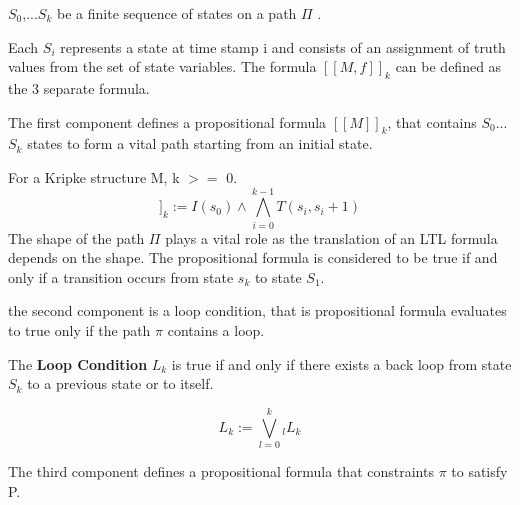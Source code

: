 $S_0$,...$S_k$ be a finite sequence of states on a path $\Pi$ .

Each $S_i$ represents a state at time stamp i and consists of an assignment of 
truth values from the set of state variables. The formula $[[M,f]]_k$ can be defined as
the 3 separate formula.

The first component defines a propositional formula $[[M]]_k$, that contains
$S_0$...$S_k$ states to form a vital path starting from an initial state.

For a Kripke structure M, k $>=$ 0.
\begin{equation}
   [[M]]_{k} := I(s_0) \wedge \bigwedge_{i=0}^{k-1} T(s_i,s_i+1)
\end{equation}   
  The shape of the path $\Pi$ plays a vital role as the translation of an LTL 
  formula depends on the shape. The propositional formula is considered to be 
  true if and only if a transition occurs from state $s_k$ to state $S_1$.
  
  the second component is a loop condition, that is propositional formula evaluates 
  to true only if the path $\pi$ contains a loop.
  
  
  The \textbf{Loop Condition} $L_k$ is true if and only if there exists a back loop
  from state $S_k$ to a previous state or to itself.
  
\begin{equation}
     L_k := \bigvee_{l=0}^{k} _{l}L_{k}
\end{equation}
   
           
          
  The third component defines a propositional formula that constraints $\pi$ to
  satisfy P.
